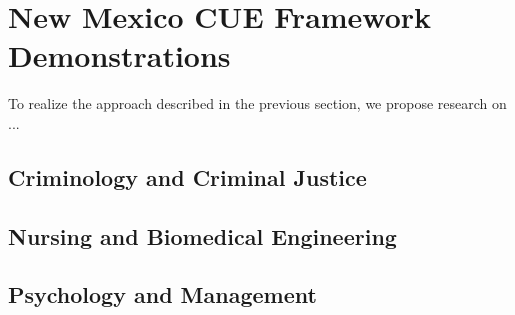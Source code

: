 \section{New Mexico CUE Framework Demonstrations}
\label{sec:pilots}

To realize the approach described in the previous section, we propose
research on ...

\subsection{Criminology and Criminal Justice}
\label{sec:demo:crim}

\subsection{Nursing and Biomedical Engineering}
\label{sec:research:med}

\subsection{Psychology and Management}
\label{sec:research:psy}
